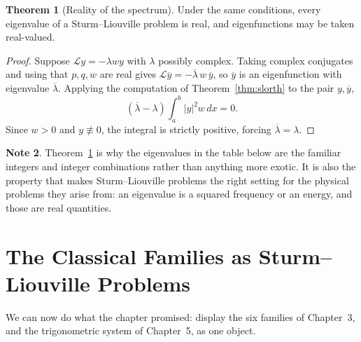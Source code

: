 \documentclass[12pt,a4paper]{report}
\theoremstyle{definition}
\newtheorem{thm}{Theorem}[section]
\newtheorem{note}[thm]{Note}
\theoremstyle{plain}
\begin{document}
\begin{thm}[Reality of the spectrum]
\label{thm:real}
Under the same conditions, every eigenvalue of a Sturm--Liouville problem is
real, and eigenfunctions may be taken real-valued.
\end{thm}

\begin{proof}
Suppose $\mathcal{L}y = -\lambda w y$ with $\lambda$ possibly complex. Taking
complex conjugates and using that $p,q,w$ are real gives
$\mathcal{L}\overline{y} = -\overline{\lambda}\,w\,\overline{y}$, so
$\overline{y}$ is an eigenfunction with eigenvalue $\overline{\lambda}$.
Applying the computation of Theorem~\ref{thm:slorth} to the pair
$y,\overline{y}$,
$$\left(\overline{\lambda}-\lambda\right)\int^{b}_{a}\left|y\right|^{2}w\,dx = 0 .$$
Since $w>0$ and $y\not\equiv0$, the integral is strictly positive, forcing
$\overline{\lambda}=\lambda$.
\end{proof}

\begin{note}
Theorem~\ref{thm:real} is why the eigenvalues in the table below are the
familiar integers and integer combinations rather than anything more exotic. It
is also the property that makes Sturm--Liouville problems the right setting for
the physical problems they arise from: an eigenvalue is a squared frequency or
an energy, and those are real quantities.
\end{note}

\section{The Classical Families as Sturm--Liouville Problems}

We can now do what the chapter promised: display the six families of Chapter~3,
and the trigonometric system of Chapter~5, as one object.
\end{document}
